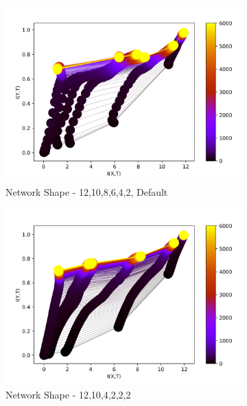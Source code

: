 \documentclass[dissertation.tex]{subfiles}
\begin{document}
\begin{figure}[ht]
  \centering
  \begin{subfigure}[t]{0.32\textwidth}
    \centering
    \includegraphics[width=\textwidth]{figs/eval/networkShapeRelu/KDE1.png}
    \caption{
      Network Shape - 12,10,8,6,4,2, Default
    }
  \end{subfigure}
  \hfill
  \begin{subfigure}[t]{0.32\textwidth}
    \centering
    \includegraphics[width=\textwidth]{figs/eval/networkShapeRelu/KDE2.png}
    \caption{
      Network Shape - 12,10,4,2,2,2
    }
  \end{subfigure}
  \hfill
  \begin{subfigure}[t]{0.32\textwidth}

\end{subfigure}
\end{figure}
\end{document}
